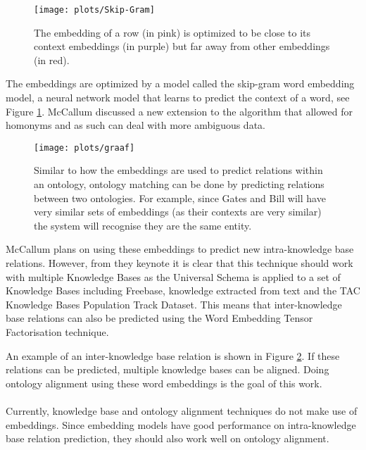 \documentclass{article}
\begin{document}
 \begin{figure}[H]
 \centering
 \texttt{[image: plots/Skip-Gram]}
 \label{Skip-Gram-img}
 \caption[Skip-Gram Model]{The embedding of a row (in pink) is optimized to be close to its context embeddings (in purple) but far away from other embeddings (in red).}
 \end{figure}
 
 The embeddings are optimized by a model called the skip-gram word embedding model\cite{w2v}, a neural network model that learns to predict the context of a word, see Figure \ref{Skip-Gram-img}. McCallum discussed a new extension to the algorithm that allowed for homonyms and as such can deal with more ambiguous data\cite{mccallumweblecture}.
  
 \begin{figure}[H]
 \centering
 \texttt{[image: plots/graaf]}
 \caption[Ontology Matching graph example]{Similar to how the embeddings are used to predict relations within an ontology, ontology matching can be done by predicting relations between two ontologies. For example, since Gates and Bill will have very similar sets of embeddings (as their contexts are very similar) the system will recognise they are the same entity.}
 \label{merge_graph}
 \end{figure}
 
 McCallum plans on using these embeddings to predict new intra-knowledge base relations. However, from they keynote it is clear that this technique should work with multiple Knowledge Bases as the Universal Schema is applied to a set of Knowledge Bases including Freebase, knowledge extracted from text and the TAC Knowledge Bases Population Track Dataset. This means that inter-knowledge base relations can also be predicted using the Word Embedding Tensor Factorisation technique.
 
 An example of an inter-knowledge base relation is shown in Figure \ref{merge_graph}. If these relations can be predicted, multiple knowledge bases can be aligned. Doing ontology alignment using these word embeddings is the goal of this work.
 \paragraph{}
 Currently, knowledge base and ontology alignment techniques do not make use of embeddings. Since embedding models have good performance on intra-knowledge base relation prediction, they should also work well on ontology alignment.
 
\end{document}
